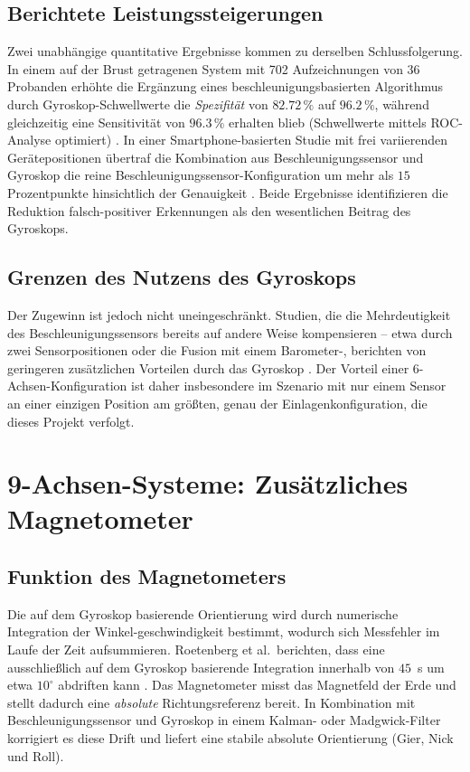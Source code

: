 \documentclass[11pt,a4paper,oneside]{report}
\begin{document}
\subsection{Berichtete Leistungssteigerungen}
Zwei unabhängige quantitative Ergebnisse kommen zu derselben Schlussfolgerung.
In einem auf der Brust getragenen System mit 702 Aufzeichnungen von
36 Probanden erhöhte die Ergänzung eines beschleunigungsbasierten Algorithmus
durch Gyroskop-Schwellwerte die \emph{Spezifität} von $82.72\,\%$ auf
$96.2\,\%$, während gleichzeitig eine Sensitivität von $96.3\,\%$ erhalten
blieb (Schwellwerte mittels ROC-Analyse optimiert)
\cite{huynh2015}. In einer Smartphone-basierten Studie mit frei variierenden
Gerätepositionen übertraf die Kombination aus Beschleunigungssensor und
Gyroskop die reine Beschleunigungssensor-Konfiguration um mehr als
$15$ Prozentpunkte hinsichtlich der Genauigkeit \cite{hakim2019}. Beide
Ergebnisse identifizieren die Reduktion falsch-positiver Erkennungen als den
wesentlichen Beitrag des Gyroskops.

\subsection{Grenzen des Nutzens des Gyroskops}
Der Zugewinn ist jedoch nicht uneingeschränkt. Studien, die die Mehrdeutigkeit
des Beschleunigungssensors bereits auf andere Weise kompensieren – etwa durch
zwei Sensorpositionen oder die Fusion mit einem Barometer-, berichten von
geringeren zusätzlichen Vorteilen durch das Gyroskop
\cite{arxiv2308_lstm,mdpi2025_realworld}. Der Vorteil einer
6-Achsen-Konfiguration ist daher insbesondere im Szenario mit nur einem Sensor
an einer einzigen Position am größten, genau der Einlagenkonfiguration, die
dieses Projekt verfolgt.

\section{9-Achsen-Systeme: Zusätzliches Magnetometer}
\label{sec:9axis}

\subsection{Funktion des Magnetometers}
Die auf dem Gyroskop basierende Orientierung wird durch numerische Integration
der Winkel-geschwindigkeit bestimmt, wodurch sich Messfehler im Laufe der Zeit
aufsummieren. Roetenberg et al.\ berichten, dass eine ausschließlich auf dem
Gyroskop basierende Integration innerhalb von $45$~s um etwa
$10^{\circ}$ abdriften kann \cite{roetenberg2005}. Das Magnetometer misst das
Magnetfeld der Erde und stellt dadurch eine \emph{absolute}
Richtungsreferenz bereit. In Kombination mit Beschleunigungssensor und
Gyroskop in einem Kalman- oder Madgwick-Filter korrigiert es diese Drift und
liefert eine stabile absolute Orientierung (Gier, Nick und Roll).
\end{document}
